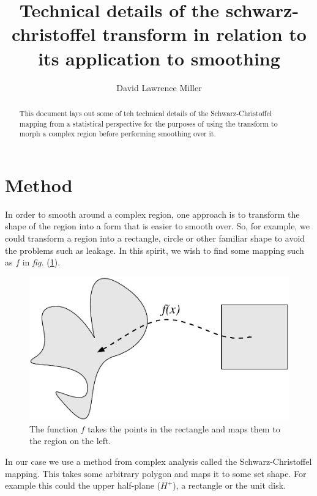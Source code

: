\documentclass[a4paper,10pt]{amsart}
\title{Technical details of the schwarz-christoffel transform in relation to its application to smoothing}
\author{David Lawrence Miller}
\newcommand{\sch}{Schwarz-Christoffel }
\newcommand{\fig}[1]{\emph{fig.} (\ref{#1})}
\begin{document}
 
\begin{abstract}
This document lays out some of teh technical details of the \sch mapping from a statistical perspective for the purposes of using the transform to morph a complex region before performing smoothing over it. 
\end{abstract}
 
 
\newtheorem{thm}{Theorem}[section]
 
\newtheorem{defn}{Definition}[section]
 
\maketitle


\section{Method}

In order to smooth around a complex region, one approach is to transform the shape of the region into a form that is easier to smooth over. So, for example, we could transform a region into a rectangle, circle or other familiar shape to avoid the problems such as leakage. In this spirit, we wish to find some mapping such as $f$ in \fig{simpledia}.

\begin{figure} [htbp]
\centering
\includegraphics[scale=0.3]{figs/simpledia.pdf}
\caption{The function $f$ takes the points in the rectangle and maps them to the region on the left.}
\label{simpledia}
\end{figure}

In our case we use a method from complex analysis called the \sch mapping. This takes some arbitrary polygon and maps it to some set shape. For example this could the upper half-plane ($H^+$), a rectangle or the unit disk. 
\end{document}
